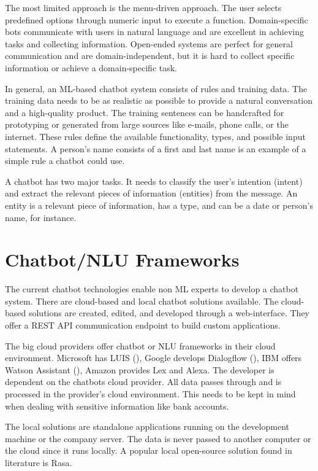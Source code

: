 The most limited approach is the menu-driven approach. 
The user selects predefined options through numeric input to execute a function.
Domain-specific bots communicate with users in natural language and are excellent in achieving tasks and collecting information.
Open-ended systems are perfect for general communication and are domain-independent, but it is hard to collect specific information
or achieve a domain-specific task. 

In general, an ML-based chatbot system consists of rules and training data.
The training data needs to be as realistic as possible to provide a natural conversation and a high-quality product.
The training sentences can be handcrafted for prototyping or generated from large sources like e-mails, phone calls, or the internet.
These rules define the available functionality, types, and possible input statements.
A person's name consists of a first and last name is an example of a simple rule a chatbot could use.

A chatbot has two major tasks.
It needs to classify the user's intention (intent) and extract the relevant pieces of information (entities) from the message.
An entity is a relevant piece of information, has a type, and can be a date or person's name, for instance.

\section{Chatbot/NLU Frameworks}
The current chatbot technologies enable non ML experts to develop a chatbot system.
There are cloud-based and local chatbot solutions available.
The cloud-based solutions are created, edited, and developed through a web-interface. 
They offer a REST API communication endpoint to build custom applications.

The big cloud providers offer chatbot or NLU frameworks in their cloud environment.
Microsoft has LUIS (\citet{luis2015williams, luisdocs}),
Google develops Dialogflow (\citet{dialogflow}),
IBM offers Watson Assistant (\citet{watsonassistant}),
Amazon provides Lex and Alexa.
The developer is dependent on the chatbots cloud provider.
All data passes through and is processed in the provider's cloud environment.
This needs to be kept in mind when dealing with sensitive information like bank accounts.

The local solutions are standalone applications running on the development machine or the company server.
The data is never passed to another computer or the cloud since it runs locally.
A popular local open-source solution found in literature is Rasa\citet{rasabocklisch2017,rasa}. 

